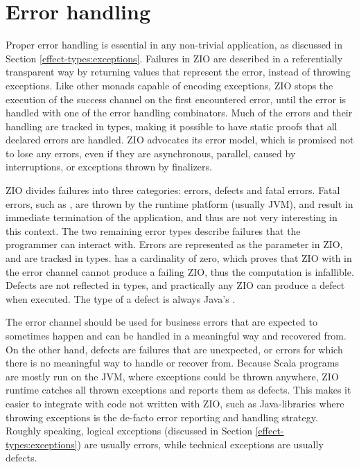



\section{Error handling} \label{zio:error-handling}
Proper error handling is essential in any non-trivial application, as discussed in Section \ref{effect-types:exceptions}. Failures in ZIO are described in a referentially transparent way by returning values that represent the error, instead of throwing exceptions. Like other monads capable of encoding exceptions, ZIO stops the execution of the success channel on the first encountered error, until the error is handled with one of the error handling combinators. Much of the errors and their handling are tracked in types, making it possible to have static proofs that all declared errors are handled. ZIO advocates its error model, which is promised not to lose any errors, even if they are asynchronous, parallel, caused by interruptions, or exceptions thrown by finalizers.

ZIO divides failures into three categories: errors, defects and fatal errors. Fatal errors, such as , are thrown by the runtime platform (usually JVM), and result in immediate termination of the application, and thus are not very interesting in this context.
The two remaining error types describe failures that the programmer can interact with. Errors are represented as the  parameter in ZIO, and are tracked in types.  has a cardinality of zero, which proves that ZIO with  in the error channel cannot produce a failing ZIO, thus the computation is infallible. Defects are not reflected in types, and practically any ZIO can produce a defect when executed. The type of a defect is always Java's .

The error channel should be used for business errors that are expected to sometimes happen and can be handled in a meaningful way and recovered from. On the other hand, defects are failures that are unexpected, or errors for which there is no meaningful way to handle or recover from. Because Scala programs are mostly run on the JVM, where exceptions could be thrown anywhere, ZIO runtime catches all thrown exceptions and reports them as defects. This makes it easier to integrate with code not written with ZIO, such as Java-libraries where throwing exceptions is the de-facto error reporting and handling strategy. Roughly speaking, logical exceptions (discussed in Section \ref{effect-types:exceptions}) are usually errors, while technical exceptions are usually defects.

